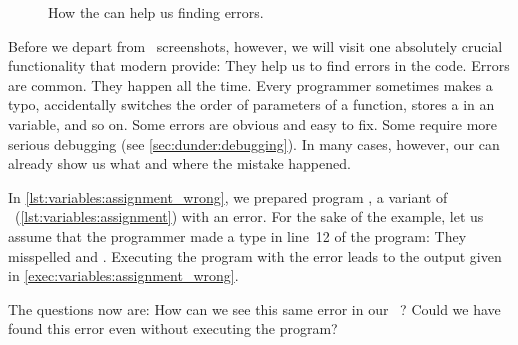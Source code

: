 %
\begin{figure}%
\ContinuedFloat%
\centering%
%
%
%
\floatRowSep%
%
%
%
\floatRowSep%
%
%
%
\caption{How the  can help us finding errors.}%
\label{fig:errorsInIdeC}%
\end{figure}%
%
Before we depart from \pycharm\ screenshots, however, we will visit one absolutely crucial functionality that modern  provide:
They help us to find errors in the code.
Errors are common.
They happen all the time.
Every programmer sometimes makes a typo, accidentally switches the order of parameters of a function, stores a  in an  variable, and so on.
Some errors are obvious and easy to fix.
Some require more serious debugging (see \cref{sec:dunder:debugging}).
In many cases, however, our  can already show us what and where the mistake happened.

In \cref{lst:variables:assignment_wrong}, we prepared program , a variant of ~(\cref{lst:variables:assignment}) with an error.
For the sake of the example, let us assume that the programmer made a type in line~12 of the program:
They misspelled  and .
Executing the program with the error leads to the output given in \cref{exec:variables:assignment_wrong}.

The questions now are:
How can we see this same error in our \pycharm\ ?
Could we have found this error even without executing the program?

